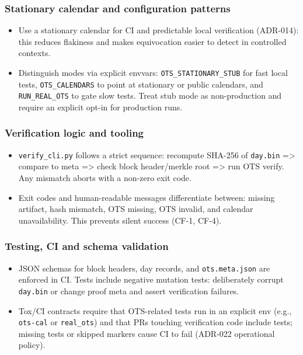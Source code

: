 \subsubsection{Stationary calendar and configuration patterns}
\begin{itemize}[nosep]
  \item Use a stationary calendar for \ac{CI} and predictable local verification (\ac{ADR}-014): this reduces flakiness and makes equivocation easier to detect in controlled contexts.
  \item Distinguish modes via explicit envvars: \texttt{OTS\_STATIONARY\_STUB} for fast local tests, \texttt{OTS\_CALENDARS} to point at stationary or public calendars, and \texttt{RUN\_REAL\_OTS} to gate slow tests.
  Treat stub mode as non-production and require an explicit opt-in for production runs.
\end{itemize}

\subsubsection{Verification logic and tooling}
\begin{itemize}[nosep]
  \item \texttt{verify\_cli.py} follows a strict sequence: recompute \ac{SHA}-256 of \texttt{day.bin} => compare to meta => check block header/merkle root => run \ac{OTS} verify.
  Any mismatch aborts with a non-zero exit code.
  \item Exit codes and human-readable messages differentiate between: missing artifact, hash mismatch, \ac{OTS} missing, \ac{OTS} invalid, and calendar unavailability.
  This prevents silent success (CF-1, CF-4).
\end{itemize}

\subsubsection{Testing, CI and schema validation}
\begin{itemize}[nosep]
  \item \ac{JSON} schemas for block headers, day records, and \texttt{ots.meta.json} are enforced in \ac{CI}.
  Tests include negative mutation tests: deliberately corrupt \texttt{day.bin} or change proof meta and assert verification failures.
  \item Tox/\ac{CI} contracts require that \ac{OTS}-related tests run in an explicit env (e.g., \texttt{ots-cal} or \texttt{real\_ots}) and that PRs touching verification code include tests; missing tests or skipped markers cause \ac{CI} to fail (\ac{ADR}-022 operational policy).
\end{itemize}

